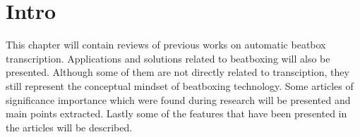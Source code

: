 \section{Intro}
This chapter will contain reviews of previous works on automatic beatbox transcription. Applications and solutions related to beatboxing will also be presented. Although some of them are not directly related to transciption, they still represent the conceptual mindset of beatboxing technology. Some articles of significance importance which were found during research will be presented and main points extracted. Lastly some of the features that have been presented in the articles will be described.